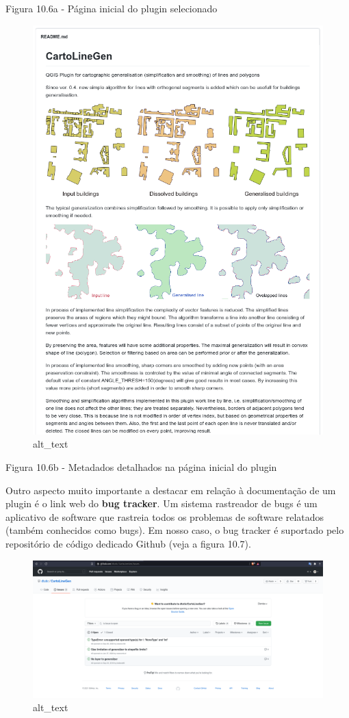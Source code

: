 \documentclass[
  portuguese,
]{krantz}
\begin{document}
Figura 10.6a - Página inicial do plugin selecionado

\begin{figure}
\centering
\includegraphics{media/modulo10/fig106_b.png}
\caption{alt\_text}
\end{figure}

Figura 10.6b - Metadados detalhados na página inicial do plugin

Outro aspecto muito importante a destacar em relação à documentação de um plugin é o link web do \textbf{bug tracker}. Um sistema rastreador de bugs é um aplicativo de software que rastreia todos os problemas de software relatados (também conhecidos como bugs). Em nosso caso, o bug tracker é suportado pelo repositório de código dedicado Github (veja a figura 10.7).

\begin{figure}
\centering
\includegraphics{media/modulo10/fig107.png}
\caption{alt\_text}
\end{figure}
\end{document}
